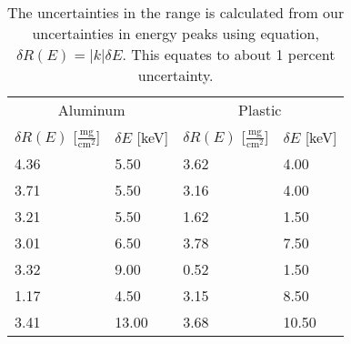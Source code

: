 \begin{table}[h] 
   \begin{center} 
      \begin{tabular}{llll}\toprule 
\multicolumn{2}{c}{Aluminum} & \multicolumn{2}{c}{Plastic}\\ 
\cmidrule(r){1-2} 
\cmidrule(r){3-4} 
$\delta R(E)$ [$\frac{\text{mg}}{\text{cm}^2}$] & $\delta E$ [keV] & $\delta R(E)$ [$\frac{\text{mg}}{\text{cm}^2}$] & $\delta E$ [keV]\\ \midrule 
    4.36 &     5.50 &     3.62 &     4.00 \\ 
    3.71 &     5.50 &     3.16 &     4.00 \\ 
    3.21 &     5.50 &     1.62 &     1.50 \\ 
    3.01 &     6.50 &     3.78 &     7.50 \\ 
    3.32 &     9.00 &     0.52 &     1.50 \\ 
    1.17 &     4.50 &     3.15 &     8.50 \\ 
    3.41 &    13.00 &     3.68 &    10.50 \\ \bottomrule 
      \end{tabular} 
   \end{center}
\caption{The uncertainties in the range is calculated from our uncertainties in energy peaks using equation,\cite{093570275X} $\delta R(E) = |k| \delta E$. This equates to about 1 percent uncertainty.} 
\label{tab:uncertaintyConversion} 
\end{table} 
